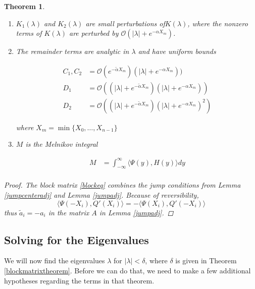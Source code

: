 \documentclass[12pt]{article}
\newtheorem{theorem}{Theorem}
\begin{document}
\begin{theorem}
\begin{enumerate}
where

\begin{align*}
a_i &= \langle \Psi(X_i), Q'(-X_i) \rangle \\
\end{align*}

\item $K_1(\lambda)$ and $K_2(\lambda)$ are small perturbations of$K(\lambda)$, where the nonzero terms of $K(\lambda)$ are perturbed by $\mathcal{O}(|\lambda| + e^{-\alpha X_m})$.

\item The remainder terms are analytic in $\lambda$ and have uniform bounds

\begin{align*}
C_1, C_2 &= \mathcal{O}(e^{-\tilde{\alpha}X_m})(|\lambda| + e^{-\alpha X_m})) \\
D_1 &= \mathcal{O}((|\lambda| + e^{-\tilde{\alpha} X_m})(|\lambda| + e^{-\alpha X_m})) \\
D_2 &= \mathcal{O}((|\lambda| + e^{-\tilde{\alpha} X_m})(|\lambda| + e^{-\alpha X_m})^2)
\end{align*}

where $X_m = \min \{X_0, \dots, X_{n-1}\}$

\item $M$ is the Melnikov integral

\begin{align*}
M &= \int_{-\infty}^\infty \langle \Psi(y), H(y) \rangle dy \\
\end{align*}

\end{enumerate}

\begin{proof}
The block matrix \eqref{blockeq} combines the jump conditions from Lemma \ref{jumpcenteradj} and Lemma \ref{jumpadj}. Because of reversibility, 
\[
\langle \Psi(-X_i), Q'(X_i) \rangle = -\langle \Psi(X_i), Q'(-X_i) \rangle
\]
thus $\tilde{a}_i = -a_i$ in the matrix $A$ in Lemma \ref{jumpadj}.
\end{proof}
\end{theorem}

\subsection{Solving for the Eigenvalues}

We will now find the eigenvalues $\lambda$ for $|\lambda| < \delta$, where $\delta$ is given in Theorem \ref{blockmatrixtheorem}. Before we can do that, we need to make a few additional hypotheses regarding the terms in that theorem.\\
\end{document}
